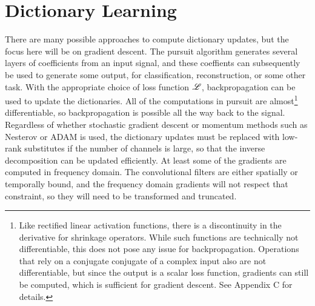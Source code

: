 \section{Dictionary Learning}
There are many possible approaches to compute dictionary updates, but the focus here will be on gradient descent. The pursuit algorithm generates several layers of coefficients from an input signal, and these coeffients can subsequently be used to generate some output, for classification, reconstruction, or some other task. With the appropriate choice of loss function $\mathscr{L}$, backpropagation can be used to update the dictionaries. All of the computations in pursuit are almost\footnote{Like rectified linear activation functions, there is a discontinuity in the derivative for shrinkage operators. While such functions are technically not differentiable, this does not pose any issue for backpropagation. Operations that rely on a conjugate conjugate of a complex input also are not differentiable, but since the output is a scalar loss function, gradients can still be computed, which is sufficient for gradient descent. See Appendix C for details.} differentiable, so backpropagation is possible all the way back to the signal. Regardless of whether stochastic gradient descent or momentum methods such as Nesterov \cite{sutskever2013importance} or ADAM \cite{kingma2017adam} is used, the dictionary updates must be replaced with low-rank substitutes if the number of channels is large, so that the inverse decomposition can be updated efficiently. At least some of the gradients are computed in frequency domain. The convolutional filters are either spatially or temporally bound, and the frequency domain gradients will not respect that constraint, so they will need to be transformed and truncated.

